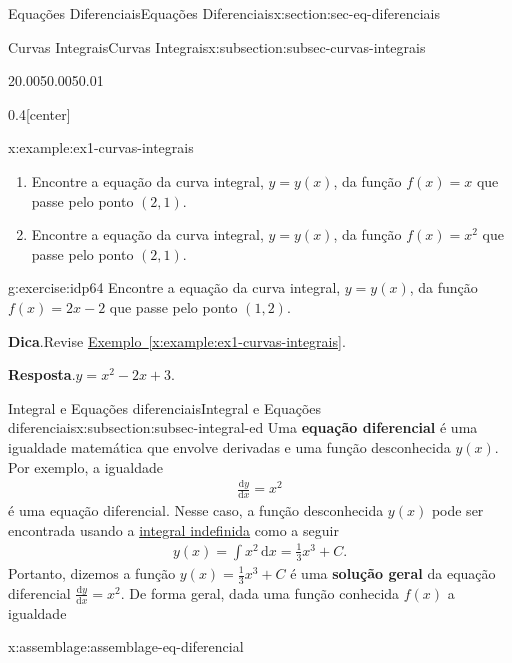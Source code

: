\documentclass[oneside,10pt,]{article}
\newcommand{\blocktitlefont}{\relax}
\newcommand{\xreffont}{\relax}
\newcommand{\terminology}[1]{\textbf{#1}}
\numberwithin{equation}{section}
\newcommand{\dd}{\mathrm{d}}
\newcommand{\integral}[2]{\displaystyle\int {#1}\,\dd {#2}}
\begin{document}
\begin{sectionptx}{Equações Diferenciais}{}{Equações Diferenciais}{}{}{x:section:sec-eq-diferenciais}
\begin{subsectionptx}{Curvas Integrais}{}{Curvas Integrais}{}{}{x:subsection:subsec-curvas-integrais}
\begin{sidebyside}{2}{0.005}{0.005}{0.01}
\begin{sbspanel}{0.4}[center]
\end{sbspanel}%
\end{sidebyside}%
%
\begin{example}{}{x:example:ex1-curvas-integrais}%
\begin{enumerate}[font=\bfseries,label=(\alph*),ref=\alph*]
\item{}Encontre a equação da curva integral, \(y=y(x)\), da função \(f(x)=x\) que passe pelo ponto \((2,1)\).%
 \item{}Encontre a equação da curva integral, \(y=y(x)\),  da função \(f(x)=x^2\) que passe pelo ponto \((2,1)\).%
\end{enumerate}
%
\end{example}
\begin{inlineexercise}{}{g:exercise:idp64}%
Encontre a equação da curva integral, \(y=y(x)\),  da função \(f(x)=2x-2\) que passe pelo ponto \((1,2)\).%
\par\smallskip%
\noindent\textbf{\blocktitlefont Dica}.\hypertarget{g:hint:idp65}{}\quad{}Revise \hyperref[x:example:ex1-curvas-integrais]{Exemplo~{\xreffont\ref{x:example:ex1-curvas-integrais}}}.%
\par\smallskip%
\noindent\textbf{\blocktitlefont Resposta}.\hypertarget{g:answer:idp66}{}\quad{}\(y=x^2-2x+3\).%
\end{inlineexercise}
\end{subsectionptx}
%
%
\typeout{************************************************}
\typeout{************************************************}
%
\begin{subsectionptx}{Integral e Equações diferenciais}{}{Integral e Equações diferenciais}{}{}{x:subsection:subsec-integral-ed}
Uma \terminology{equação diferencial}  é uma igualdade matemática que envolve   derivadas e uma função desconhecida \(y(x)\). Por exemplo, a igualdade%
\begin{gather*}
\frac{\dd y}{\dd x} = x^2 
\end{gather*}
é uma equação diferencial. Nesse caso, a função desconhecida \(y(x)\) pode ser encontrada usando a \hyperref[x:mrow:eq-integral-indefinida]{integral indefinida} como a seguir%
\begin{gather*}
y(x) = \integral{x^2}{x}=\frac{1}{3}x^3 +C.
\end{gather*}
Portanto, dizemos a função \(y(x)=\frac{1}{3}x^3 +C\) é uma \terminology{solução geral} da equação diferencial \(\frac{\dd y}{\dd x} = x^2\). De forma geral, dada uma função conhecida \(f(x)\) a igualdade \begin{assemblage}{}{x:assemblage:assemblage-eq-diferencial}%

\end{assemblage}
\end{subsectionptx}
\end{sectionptx}
\end{document}
